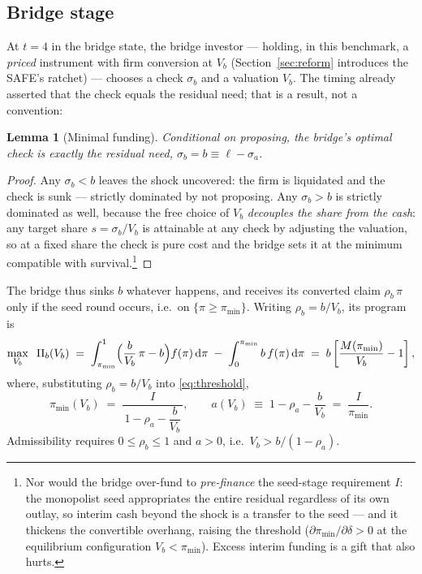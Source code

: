 \documentclass[11pt]{article}
\newtheorem{lemma}{Lemma}
\theoremstyle{definition}
\newcommand{\pimin}{\pi_{\min}}
\newcommand{\dd}{\,\mathrm{d}}
\begin{document}
\subsection{Bridge stage}

At $t=4$ in the bridge state, the bridge investor --- holding, in this benchmark, a \emph{priced} instrument with firm conversion at $V_b$ (Section~\ref{sec:reform} introduces the SAFE's ratchet) --- chooses a check $\sigma_b$ and a valuation $V_b$. The timing already asserted that the check equals the residual need; that is a result, not a convention:

\begin{lemma}[Minimal funding]\label{lem:minimalfunding}
Conditional on proposing, the bridge's optimal check is exactly the residual need, $\sigma_b=b\equiv\ell-\sigma_a$.
\end{lemma}

\begin{proof}
Any $\sigma_b<b$ leaves the shock uncovered: the firm is liquidated and the check is sunk --- strictly dominated by not proposing. Any $\sigma_b>b$ is strictly dominated as well, because the free choice of $V_b$ \emph{decouples the share from the cash}: any target share $s=\sigma_b/V_b$ is attainable at any check by adjusting the valuation, so at a fixed share the check is pure cost and the bridge sets it at the minimum compatible with survival.\footnote{Nor would the bridge over-fund to \emph{pre-finance} the seed-stage requirement $I$: the monopolist seed appropriates the entire residual regardless of its own outlay, so interim cash beyond the shock is a transfer to the seed --- and it thickens the convertible overhang, raising the threshold ($\partial\pimin/\partial\delta>0$ at the equilibrium configuration $V_b<\pimin$). Excess interim funding is a gift that also hurts.}
\end{proof}

The bridge thus sinks $b$ whatever happens, and receives its converted claim $\rho_b\,\pi$ only if the seed round occurs, i.e.\ on $\{\pi \ge \pimin\}$. Writing $\rho_b = b/V_b$, its program is
\begin{equation}
\max_{V_b}\;\;
\Pi_b(V_b) \;=\;
\int_{\pimin}^{1} \Bigl(\frac{b}{V_b}\,\pi - b\Bigr) f(\pi)\dd\pi
\;-\; \int_0^{\pimin} b\, f(\pi)\dd\pi
\;=\; b\left[\frac{M(\pimin)}{V_b} - 1\right],
\label{eq:bridgeobj}
\end{equation}
where, substituting $\rho_b = b/V_b$ into \eqref{eq:threshold},
\begin{equation}
\pimin(V_b) \;=\; \frac{I}{\,1-\rho_a - \dfrac{b}{V_b}\,},
\qquad
a(V_b) \;\equiv\; 1-\rho_a-\frac{b}{V_b} \;=\; \frac{I}{\pimin}.
\label{eq:piminVb}
\end{equation}
Admissibility requires $0 \le \rho_b \le 1$ and $a > 0$, i.e.\ $V_b > b/(1-\rho_a)$.
\end{document}
